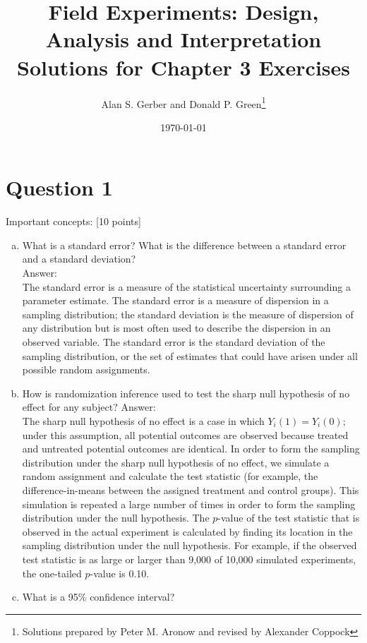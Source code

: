 \documentclass[11pt,notitlepage]{article}\usepackage[]{graphicx}\usepackage[]{color}
\begin{document}
\title{Field Experiments: Design, Analysis and Interpretation \\
Solutions for Chapter 3 Exercises}
\author{Alan S. Gerber and Donald P. Green\footnote{Solutions prepared by Peter M. Aronow and revised by Alexander Coppock}}
\date{\today}
\maketitle

\section*{Question 1}
Important concepts: [10 points]
\begin{enumerate}[a)]
\item What is a standard error?  What is the difference between a standard error and a standard deviation?\\
Answer:\\
The standard error is a measure of the statistical uncertainty surrounding a parameter estimate. The standard error is a measure of dispersion in a sampling distribution; the standard deviation is the measure of dispersion of any distribution but is most often used to describe the dispersion in an observed variable. The standard error is the standard deviation of the sampling distribution, or the set of estimates that could have arisen under all possible random assignments. 
\item How is randomization inference used to test the sharp null hypothesis of no effect for any subject? 
Answer:\\ 
The sharp null hypothesis of no effect is a case in which $Y_i (1)= Y_i (0)$; under this assumption, all potential outcomes are observed because treated and untreated potential outcomes are identical.  In order to form the sampling distribution under the sharp null hypothesis of no effect, we simulate a random assignment and calculate the test statistic (for example, the difference-in-means between the assigned treatment and control groups). This simulation is repeated a large number of times in order to form the sampling distribution under the null hypothesis.  The $p$-value of the test statistic that is observed in the actual experiment is calculated by finding its location in the sampling distribution under the null hypothesis. For example, if the observed test statistic is as large or larger than 9,000 of 10,000 simulated experiments, the one-tailed $p$-value is 0.10.
\item What is a 95\% confidence interval?  \\

\end{enumerate}
\end{document}
